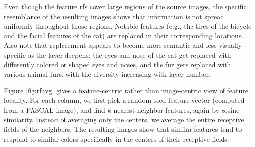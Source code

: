 \documentclass{article} \usepackage{nips14submit_e,times}
\begin{document}
Even though the feature rfs cover large regions of the source images, the
specific resemblance of the resulting images shows that information is not
spread uniformly throughout those regions.
Notable features (e.g., the tires of the bicycle and the facial features of the
cat) are replaced in their corresponding locations.
Also note that replacement appears to become more semantic and less visually
specific as the layer deepens: the eyes and nose of the cat get replaced with
differently colored or shaped eyes and noses, and the fur gets replaced with
various animal furs, with the diversity increasing with layer number.

Figure \ref{fig:rfavg} gives a feature-centric rather than image-centric view of
feature locality.
For each column, we first pick a random seed feature vector (computed from
a PASCAL image), and find $k$ nearest neighbor features, again by cosine
similarity.
Instead of averaging only the centers, we average the entire receptive fields of
the neighbors.
The resulting images show that similar features tend to respond to similar
colors specifically in the centers of their receptive fields.
\end{document}
